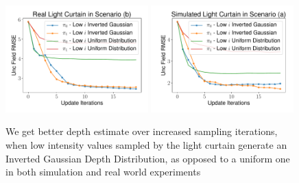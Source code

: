 \begin{figure}[h]
    \centering
    \begin{minipage}{0.5\textwidth}
        \centering
        \includegraphics[width=0.49\textwidth]{figures/Figure_1.pdf}
        \includegraphics[width=0.49\textwidth]{figures/Figure_0.pdf}
    \end{minipage}\hfill
    \centering
    \caption{We get better depth estimate over increased sampling iterations, when low intensity values sampled by the light curtain generate an Inverted Gaussian Depth Distribution, as opposed to a uniform one in both simulation and real world experiments}
    \label{fig:figure01}
\end{figure}

